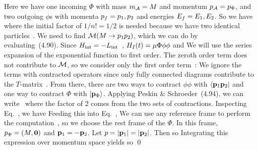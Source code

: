 {	Here we have one incoming $\Phi$ with mass $m_{\mathcal{A}} = M$ and momentum $p_{\mathcal{A}} = p_\Phi$, and two outgoing $\phi$s with  momenta $p_f = p_1, p_2$ and energies $E_f = E_1, E_2$.  So we have
	where the initial factor of $1/n! = 1/2$ is needed because we have two identical particles~\cite[p.~108]{Peskin}.  We need to find $\mathcal{M}(M \to p_1 p_2)$, which we can do by evaluating~(4.90).  Since $H_\text{int} = -L_\text{int}$~\cite[p.~77]{Peskin}, $H_I(t) = \mu \Phi \phi \phi$ and
	We will use the series expansion of the exponential function to first order.  The zeroth order term does not contribute to $\mathcal{M}$, so we consider only the first order term~\cite[p.~110]{Peskin}:
	We ignore the terms with contracted operators since only fully connected diagrams contribute to the $T$-matrix~\cite[p.~111]{Peskin}.  From there, there are two ways to contract $\phi \phi$ with $\bra{\vb{p}_1 \vb{p}_2}$ and one way to contract $\Phi$ with $\ket{\vb{p}_\Phi}$.  Applying Peskin \& Schroeder~(4.94),
	we can write~\cite[p.~112]{Peskin}
	where the factor of 2 comes from the two sets of contractions.  Inspecting Eq.~, we have
	Feeding this into Eq.~,
	We can use any reference frame to perform the computation~\cite[p.~100]{Peskin}, so we choose the rest frame of the $\Phi$.  In this frame, $p_\Phi = (M, \mathbf{0})$ and $\vb{p}_1 = -\vb{p}_2$.  Let $p = \abs{\vb{p}_1} = \abs{\vb{p}_2}$.  Then
	so
	Integrating this expression over momentum space yields
	so
	\qed
}
